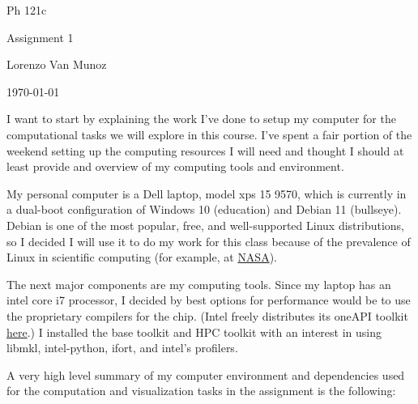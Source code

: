 \documentclass{article}
\begin{document}
{\centering

Ph 121c

Assignment 1

Lorenzo Van Munoz

\today

}

\newpage

I want to start by explaining the work I've done to setup my computer for
the computational tasks we will explore in this course.
I've spent a fair portion of the weekend setting up the computing resources I
will need and thought I should at least provide and overview of my computing
tools and environment.
\par

My personal computer is a Dell laptop, model xps 15 9570, which is currently
in a dual-boot configuration of Windows 10 (education) and Debian 11 (bullseye).
Debian is one of the most popular, free, and well-supported Linux
distributions, so I decided I will use it to do my work for this class because
of the prevalence of Linux in scientific computing
(for example, at \href{https://www.nas.nasa.gov/hecc/}{NASA}).
\par

The next major components are my computing tools.
Since my laptop has an intel core i7 processor, I decided by best options for
performance would be to use the proprietary compilers for the chip.
(Intel freely distributes its oneAPI toolkit
\href{https://software.intel.com/content/www/us/en/develop/articles/free-intel-software-developer-tools.html}{here}.)
I installed the base toolkit and HPC toolkit with an interest in using libmkl,
intel-python, ifort, and intel's profilers.
\par

A very high level summary of my computer environment and dependencies used for
the computation and visualization tasks in the assignment is the following:


\end{document}
